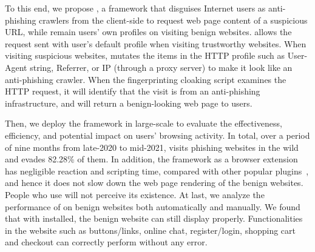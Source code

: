 To this end, we propose \spartacus, a framework that disguises Internet users as anti-phishing crawlers from the client-side to request web page content of a suspicious URL, while remain users' own profiles on visiting benign websites.
\spartacus allows the request sent with user's default profile when visiting trustworthy websites.
When visiting suspicious websites, \spartacus mutates the items in the HTTP profile such as User-Agent string, Referrer, or IP (through a proxy server) to make it look like an anti-phishing crawler.
When the fingerprinting cloaking script examines the HTTP request, it will identify that the visit is from an anti-phishing infrastructure, and will return a benign-looking web page to users.
% 


Then, we deploy the \spartacus framework in large-scale to evaluate the effectiveness, efficiency, and potential impact on users' browsing activity.
In total, over a period of nine months from late-2020 to mid-2021, \spartacus visits \totalphishing phishing websites in the wild and evades 82.28\% of them.
In addition, the \spartacus framework as a browser extension has negligible reaction and scripting time, compared with other popular plugins~\cite{exthouse}, and hence it does not slow down the web page rendering of the benign websites.
People who use \spartacus will not perceive its existence.
At last, we analyze the performance of \spartacus on benign websites both automatically and manually.
We found that with \spartacus installed, the benign website can still display properly.
Functionalities in the website such as buttons/links, online chat, register/login, shopping cart and checkout can correctly perform without any error.


